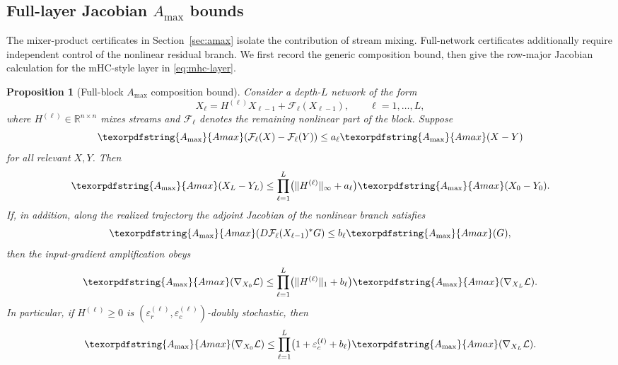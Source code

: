 \documentclass[10pt]{article}
\numberwithin{equation}{section}
\theoremstyle{plain}
\newtheorem{proposition}[theorem]{Proposition}
\theoremstyle{definition}
\theoremstyle{remark}
\newcommand{\R}{\mathbb{R}}
\newcommand{\Amax}{\texorpdfstring{\ensuremath{A_{\max}}}{Amax}\xspace}
\begin{document}
\subsection{Full-layer Jacobian \Amax bounds}\label{app:jacobian}

The mixer-product certificates in Section~\ref{sec:amax} isolate the contribution of stream mixing.
Full-network certificates additionally require independent control of the nonlinear
residual branch. We first record the generic composition bound, then give the
row-major Jacobian calculation for the mHC-style layer in \eqref{eq:mhc-layer}.

\begin{proposition}[Full-block \Amax composition bound]\label{prop:full-block-amax}
Consider a depth-$L$ network of the form
\begin{equation}\label{eq:full-block-generic}
        X_\ell=H^{(\ell)}X_{\ell-1}+\mathcal F_\ell(X_{\ell-1}),
        \qquad \ell=1,\dots,L,
\end{equation}
where $H^{(\ell)}\in\R^{n\times n}$ mixes streams and $\mathcal F_\ell$ denotes the remaining nonlinear part of the block. Suppose
\begin{equation}\label{eq:F-forward-lip}
        \Amax(\mathcal F_\ell(X)-\mathcal F_\ell(Y))
        \le a_\ell\Amax(X-Y)
\end{equation}
for all relevant $X,Y$. Then
\begin{equation}\label{eq:full-forward-bound}
        \Amax(X_L-Y_L)
        \le
        \prod_{\ell=1}^L\bigl(\|H^{(\ell)}\|_\infty+a_\ell\bigr)
        \Amax(X_0-Y_0).
\end{equation}
If, in addition, along the realized trajectory the adjoint Jacobian of the nonlinear branch satisfies
\begin{equation}\label{eq:F-backward-lip}
        \Amax\!\left(D\mathcal F_\ell(X_{\ell-1})^*G\right)
        \le b_\ell\Amax(G),
\end{equation}
then the input-gradient amplification obeys
\begin{equation}\label{eq:full-backward-bound}
        \Amax(\nabla_{X_0}\mathcal L)
        \le
        \prod_{\ell=1}^L\bigl(\|H^{(\ell)}\|_1+b_\ell\bigr)
        \Amax(\nabla_{X_L}\mathcal L).
\end{equation}
In particular, if $H^{(\ell)}\ge0$ is $(\varepsilon_r^{(\ell)},\varepsilon_c^{(\ell)})$-doubly stochastic, then
\begin{equation}\label{eq:full-block-marginal-bound}
        \Amax(\nabla_{X_0}\mathcal L)
        \le
        \prod_{\ell=1}^L\bigl(1+\varepsilon_c^{(\ell)}+b_\ell\bigr)
        \Amax(\nabla_{X_L}\mathcal L).
\end{equation}
\end{proposition}
\end{document}
